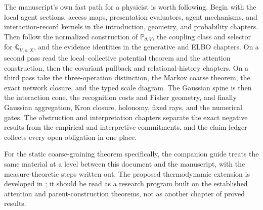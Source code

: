 \documentclass[11pt,letterpaper]{article}
\begin{document}
The manuscript's own fast path for a physicist is worth following. Begin with the local agent sections, access maps, presentation evaluators, agent mechanisms, and interaction-record kernels in the introduction, geometry, and probability chapters. Then follow the normalized construction of \(\mathbb P_{\theta,V}\), the coupling class and selector for \(\mathbb Q_{V,o,X}\), and the evidence identities in the generative and ELBO chapters. On a second pass read the local--collective potential theorem and the attention construction, then the covariant pullback and relational-history chapters. On a third pass take the three-operation distinction, the Markov coarse theorem, the exact network closure, and the typed scale diagram. The Gaussian spine is then the interaction cone, the recognition costs and Fisher geometry, and finally Gaussian aggregation, Kron closure, holonomy, fixed rays, and the numerical gates. The obstruction and interpretation chapters separate the exact negative results from the empirical and interpretive commitments, and the claim ledger collects every open obligation in one place.

For the static coarse-graining theorem specifically, the companion guide  treats the same material at a level between this document and the manuscript, with the measure-theoretic steps written out. The proposed thermodynamic extension is developed in ; it should be read as a research program built on the established attention and parent-construction theorems, not as another chapter of proved results.
\end{document}
